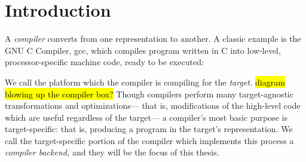 \chapter{Introduction}

A \textit{compiler}
  converts from one representation
  to another.
A classic example
  is the GNU C Compiler, gcc, which
  compiles program written in C
  into low-level, processor-specific
  machine code,
  ready to be executed:
\begin{figure}[!h]
\centering
{}
\end{figure}

\noindent
We call the platform
  which the compiler is compiling for
  the \textit{target.}
% 
% 
\hl{diagram blowing up the compiler box?}
Though compilers perform many target-agnostic
  transformations and optimizations---%
  that is, modifications of the high-level code
  which are useful regardless of the target---%
  a compiler's most basic purpose
  is target-specific: that is,
  producing a program
  in the target's representation.
We call the target-specific portion
  of the compiler
  which implements this process
  a \textit{compiler backend,}
  and they will be the focus of this thesis.
  
